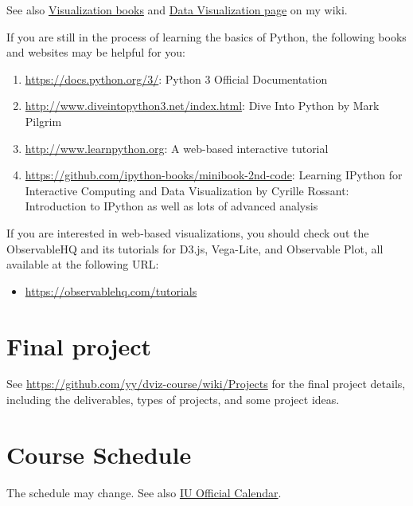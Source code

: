 \documentclass[11pt,article,oneside]{memoir} %
\begin{document}
See also \href{https://yyiki.org/wiki/Data%20visualization/Books/}{Visualization books} and \href{https://yyiki.org/wiki/Data%20visualization/}{Data Visualization page} on my wiki. 


If you are still in the process of learning the basics of Python, the following books and websites may be helpful for you:

\begin{enumerate}%

\item \url{https://docs.python.org/3/}: Python 3 Official Documentation

\item \url{http://www.diveintopython3.net/index.html}: Dive Into Python by Mark Pilgrim 

\item \url{http://www.learnpython.org}: A web-based interactive tutorial 

\item \url{https://github.com/ipython-books/minibook-2nd-code}: Learning IPython for Interactive Computing and Data Visualization by Cyrille Rossant: Introduction to IPython as well as lots of advanced analysis 

\end{enumerate}%

If you are interested in web-based visualizations, you should check out the ObservableHQ and its tutorials for D3.js, Vega-Lite, and Observable Plot, all available at the following URL:

\begin{itemize}
    \item \url{https://observablehq.com/tutorials}
\end{itemize}

\section{Final project}%

See \url{https://github.com/yy/dviz-course/wiki/Projects} for the final project details, including the deliverables, types of projects, and some project ideas. 

\section{Course Schedule}%

The schedule may change. See also \href{https://registrar.indiana.edu/official-calendar/index.shtml}{IU Official Calendar}. 
\end{document}
